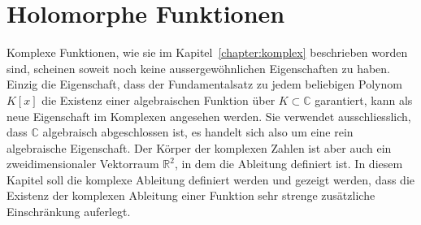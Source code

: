 %
%
%
\chapter{Holomorphe Funktionen
\label{chapter:holomorph}}

Komplexe Funktionen, wie sie im Kapitel~\ref{chapter:komplex} beschrieben
worden sind, scheinen soweit noch keine aussergewöhnlichen Eigenschaften
zu haben.
Einzig die Eigenschaft, dass der Fundamentalsatz zu jedem
beliebigen Polynom $K[x]$ die Existenz einer algebraischen Funktion
über $K\subset\mathbb{C}$ garantiert, kann als neue Eigenschaft im 
Komplexen angesehen werden.
Sie verwendet ausschliesslich, dass $\mathbb{C}$ algebraisch
abgeschlossen ist, es handelt sich also um eine rein algebraische
Eigenschaft.
Der Körper der komplexen Zahlen ist aber auch ein zweidimensionaler
Vektorraum $\mathbb{R}^2$, in dem die Ableitung definiert ist.
In diesem Kapitel soll die komplexe Ableitung definiert werden und
gezeigt werden, dass die Existenz der komplexen Ableitung einer 
Funktion sehr strenge zusätzliche Einschränkung auferlegt.

\def\Jf{J\!f}





\pagebreak
\uebungsabschnitt

\begin{uebungsaufgaben}
\end{uebungsaufgaben}
\enduebungsabschnitt

